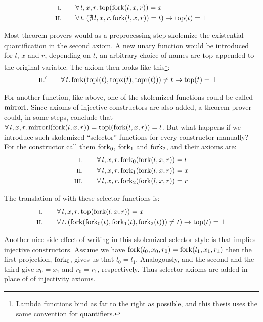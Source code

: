 \begin{align*}
\rom{1} \qquad & \faaa{l}{x}{r} \fn{top}(\fn{fork}(l,x,r)) \eq x \\
\rom{2} \qquad & \fa{t}         (\nexxx{l}{x}{r} \fn{fork}(l,x,r)) \eq t) \rightarrow \fn{top}(t) \eq \bot
\end{align*}

Most theorem provers would as a preprocessing step skolemize the existential quantification in the second
axiom. A new unary function would be introduced for $l$, $x$ and $r$,
depending on $t$, an arbitrary choice of names are $\mathrm{top}$ appended
to the original variable. The axiom then looks like
this\footnote{Lambda functions bind as far to the right as possible,
  and this thesis uses the same convention for quantifiers.}:
\begin{align*}
\rom{2}' \qquad & \fa{t} \fn{fork}(\fn{topl}(t),\fn{topx}(t),\fn{topr}(t))) \neq t \rightarrow \fn{top}(t) \eq \bot
\end{align*}

For another function, like  above, one of the skolemized
functions could be called $\mathrm{mirrorl}$. Since axioms of injective
constructors are also added, a theorem prover could, in some steps,
conclude that $\forall \, l , x , r . \, \mathrm{mirrorl}(\mathrm{fork}(l,x,r)) =
\mathrm{topl}(\mathrm{fork}(l,x,r)) = l$. But what happens if we introduce
such skolemized ``selector'' functions for every constructor manually?
For the  constructor call them $\mathrm{fork_0}$, $\mathrm{fork_1}$
and $\mathrm{fork_2}$, and their axioms are:
\begin{align*}
\rom{1} \qquad \faaa{l}{x}{r} \fn{fork_{0}}(\fn{fork}(l,x,r)) & \eq l \\
\rom{2} \qquad \faaa{l}{x}{r} \fn{fork_{1}}(\fn{fork}(l,x,r)) & \eq x \\
\rom{3} \qquad \faaa{l}{x}{r} \fn{fork_{2}}(\fn{fork}(l,x,r)) & \eq r
\end{align*}

\noindent
The translation of  with these selector functions is:
\begin{align*}
\rom{1} \qquad & \faaa{l}{x}{r} \fn{top}(\fn{fork}(l,x,r)) \eq x \\
\rom{2} \qquad & \fa{t}         (\fn{fork}(\fn{fork_0}(t),\fn{fork_1}(t),\fn{fork_2}(t))) \neq t) \rightarrow \fn{top}(t) \eq \bot
\end{align*}

\noindent
Another nice side effect of writing in this skolemized selector style
is that implies injective constructors. Assume we have
$\mathrm{fork}(l_0,x_0,r_0)=\mathrm{fork}(l_1,x_1,r_1)$ then the first
projection, $\mathrm{fork_0}$, gives us that $l_0=l_1$. Analogously, and
the second and the third give $x_0=x_1$ and $r_0=r_1$,
respectively. Thus selector axioms are added in place of of
injectivity axioms.

